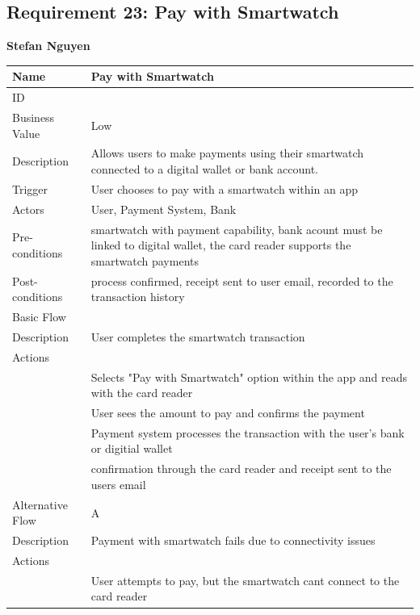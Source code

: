 \documentclass{article}
\begin{document}
\subsection{Requirement 23: Pay with Smartwatch}
	\textbf{Stefan Nguyen}
	\begin{center}
		\begin{tabularx}{1.0\textwidth}{|>{\raggedright\arraybackslash}p{}|>{\raggedright\arraybackslash}X|}
			\hline
			Name             & Pay with Smartwatch \\ \hline
			ID               & 23 \\ \hline
			Business Value   & Low \\ \hline
			Description      & Allows users to make payments using their smartwatch connected to a digital wallet or bank account. \\ \hline
			Trigger          & User chooses to pay with a smartwatch within an app  \\ \hline
			Actors           & User, Payment System, Bank \\ \hline
			Pre-conditions   & smartwatch with payment capability, bank acount must be linked to digital wallet, the card reader supports the smartwatch payments \\ \hline
			Post-conditions  & process confirmed, receipt sent to user email, recorded to the transaction history \\ \hline
			Basic Flow       & \\ \hline
							Description & User completes the smartwatch transaction \\ \hline
							Actions & \\ \hline
							1 & Selects "Pay with Smartwatch" option within the app and reads with the card reader \\ \hline
							2 & User sees the amount to pay and confirms the payment  \\ \hline
							3 & Payment system processes the transaction with the user's bank or digitial wallet \\ \hline
							4 & confirmation through the card reader and receipt sent to the users email \\ \hline
			Alternative Flow & A \\ \hline
							Description & Payment with smartwatch fails due to connectivity issues \\ \hline
							Actions & \\ \hline
							1 & User attempts to pay, but the smartwatch cant connect to the card reader \\ \hline

\end{tabularx}
\end{center}
\end{document}
